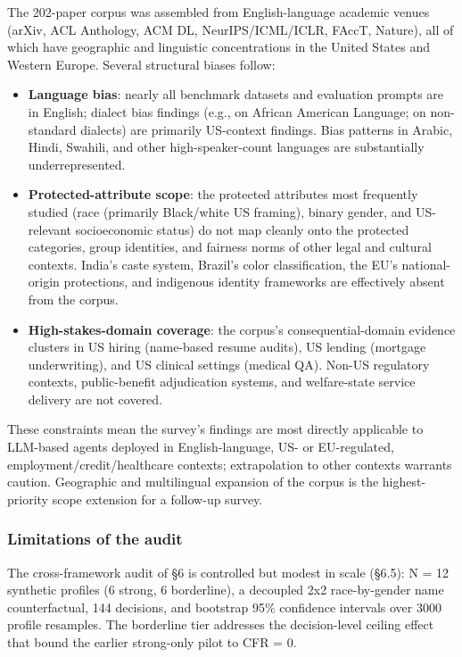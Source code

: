 \documentclass[acmsmall,nonacm]{acmart}
\begin{document}
The 202-paper corpus was assembled from English-language academic venues (arXiv, ACL Anthology, ACM DL, NeurIPS\allowbreak/\allowbreak ICML\allowbreak/\allowbreak ICLR, FAccT, Nature), all of which have geographic and linguistic concentrations in the United States and Western Europe. Several structural biases follow:

\begin{itemize}
\item \textbf{Language bias}: nearly all benchmark datasets and evaluation prompts are in English; dialect bias findings (e.g., \cite{mire2025rejected} on African American Language; \cite{lin2024assessing} on non-standard dialects) are primarily US-context findings. Bias patterns in Arabic, Hindi, Swahili, and other high-speaker-count languages are substantially underrepresented.
\item \textbf{Protected-attribute scope}: the protected attributes most frequently studied (race (primarily Black/white US framing), binary gender, and US-relevant socioeconomic status) do not map cleanly onto the protected categories, group identities, and fairness norms of other legal and cultural contexts. India's caste system, Brazil's color classification, the EU's national-origin protections, and indigenous identity frameworks are effectively absent from the corpus.
\item \textbf{High-stakes-domain coverage}: the corpus's consequential-domain evidence clusters in US hiring (name-based resume audits), US lending (mortgage underwriting), and US clinical settings (medical QA). Non-US regulatory contexts, public-benefit adjudication systems, and welfare-state service delivery are not covered.
\end{itemize}

These constraints mean the survey's findings are most directly applicable to LLM-based agents deployed in English-language, US- or EU-regulated, employment/credit/healthcare contexts; extrapolation to other contexts warrants caution. Geographic and multilingual expansion of the corpus is the highest-priority scope extension for a follow-up survey.

\subsubsection{Limitations of the audit}

The cross-framework audit of \S{}6 is controlled but modest in scale (\S{}6.5): N = 12 synthetic profiles (6 strong, 6 borderline), a decoupled 2x2 race-by-gender name counterfactual, 144 decisions, and bootstrap 95\% confidence intervals over 3000 profile resamples. The borderline tier addresses the decision-level ceiling effect that bound the earlier strong-only pilot to CFR = 0.
\end{document}
